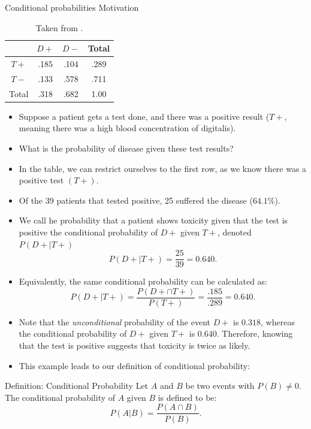 \begin{frame}[allowframebreaks]{Conditional probabilities Motivation}
    \begin{table}
    \centering
    \begin{tabular}{c|cc|c}
            & $D+$  & $D-$ & Total \\\hline
      $T+$  & .185  & .104 & .289 \\
      $T-$  & .133  & .578 & .711 \\\hline
      Total & .318  & .682 & 1.00 \\
    \end{tabular}
    \caption{\label{tab:digitalisProps}Taken from \citep[][Chapter~1]{rice07}.}
  \end{table}
  
  \begin{itemize}
    \item Suppose a patient gets a test done, and there was a positive result ($T+$, meaning there was a high blood concentration of digitalis).
    \item What is the probability of disease given these test results?
  \end{itemize}
  
  \begin{itemize}
    \item In the table, we can restrict ourselves to the first row, as we know there was a positive test $(T+)$. 
    \item Of the 39 patients that tested positive, 25 suffered the disease ($64.1\%$).
    \item We call he probability that a patient shows toxicity given that the test is positive the \alert{conditional probability} of $D+$ given $T+$, denoted $P(D+ | T+)$
  $$
  P(D+ | T+) = \frac{25}{39} = 0.640.
  $$
  
    \item Equivalently, the same conditional probability can be calculated as:
  $$
  P(D+ | T+) = \frac{P(D+ \cap T+)}{P(T+)} = \frac{.185}{.289} = 0.640.
  $$
  
    \item Note that the \emph{unconditional} probability of the event $D+$ is $0.318$, whereas the conditional probability of $D+$ given $T+$ is $0.640$. Therefore, knowing that the test is positive suggests that toxicity is twice as likely.
  
    \item This example leads to our definition of conditional probability:
  \end{itemize}
  
  \begin{block}{Definition: Conditional Probability}
    Let $A$ and $B$ be two events with $P(B) \neq 0$. The conditional probability of $A$ given $B$ is defined to be:
    $$
    P(A|B) = \frac{P(A \cap B)}{P(B)}.
    $$
  \end{block}
  

\end{frame}
